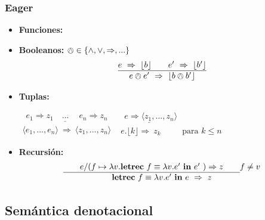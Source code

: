     \subsubsection{Eager}
      \begin{itemize}
        \item \textbf{Funciones:}
          \begin{prooftree}
          \end{prooftree}
        \item \textbf{Booleanos:} $\owedge \in \{\wedge, \vee, \Rightarrow,...\}$
          \[\begin{array}{c}
          \underline{e\ \Rightarrow\ \lfloor b\rfloor\qquad e'\ \Rightarrow\ \lfloor b'\rfloor}\\
          e \owedge e'\ \Rightarrow\ \lfloor b \owedge b'\rfloor
          \end{array}\]
        \item \textbf{Tuplas:}
          \begin{multicols}{2}
            $\begin{array}{c}
              \underline{\ \ e_1 \Rightarrow z_1 \quad ... \quad \ e_n \Rightarrow z_n } \\
              \langle e_1,...,e_n\rangle\ \Rightarrow\ \langle z_1,...,z_n\rangle
            \end{array}$
            $\begin{array}{c}
              \underline{\ \ e \Rightarrow \langle z_1,...,z_n\rangle} \qquad \qquad \qquad \qquad \\
              e.\lfloor k\rfloor \Rightarrow\ z_k \qquad \ \text{ para } k \leq n
            \end{array}$
          \end{multicols}
        \item \textbf{Recursión:}
          \[\begin{array}{c}
            \underline{\qquad e/(f\mapsto \lambda v.\letrecin{f \equiv \lambda v.e'}{e'})
            \Rightarrow z\qquad } f \neq v\\
            \letrecin{f \equiv \lambda v.e'}{e} \Rightarrow \ z
          \end{array}\]
      \end{itemize}

  \subsection{Semántica denotacional}

